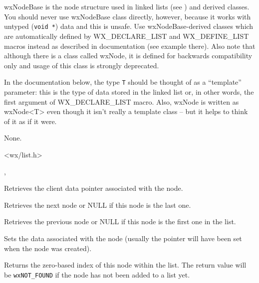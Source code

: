 \section{}\label{wxnode}

wxNodeBase is the node structure used in linked lists (see 
) and derived classes. You should never use wxNodeBase
class directly, however, because it works with untyped ({\tt void *}) data and
this is unsafe. Use wxNodeBase-derived classes which are automatically defined
by WX\_DECLARE\_LIST and WX\_DEFINE\_LIST macros instead as described in
 documentation (see example there). Also note that
although there is a class called wxNode, it is defined for backwards
compatibility only and usage of this class is strongly deprecated.

In the documentation below, the type {\tt T} should be thought of as a
``template'' parameter: this is the type of data stored in the linked list or,
in other words, the first argument of WX\_DECLARE\_LIST macro. Also, wxNode is
written as wxNode<T> even though it isn't really a template class -- but it
helps to think of it as if it were.


None.


<wx/list.h>


, 


\label{wxnodegetdata}


Retrieves the client data pointer associated with the node.

\label{wxnodegetnext}


Retrieves the next node or NULL if this node is the last one.

\label{wxnodegetprevious}


Retrieves the previous node or NULL if this node is the first one in the list.

\label{wxnodesetdata}


Sets the data associated with the node (usually the pointer will have been
set when the node was created).

\label{wxnodeindexof}


Returns the zero-based index of this node within the list. The return value
will be {\tt wxNOT\_FOUND} if the node has not been added to a list yet.

